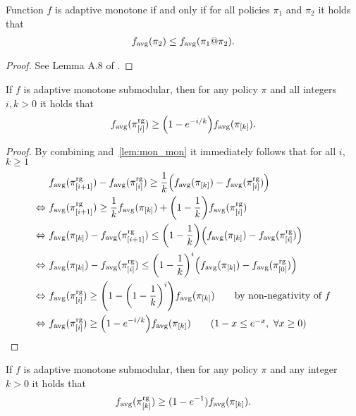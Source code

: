 \begin{lemma}\label{lem:mon_mon}
  Function $f$ is adaptive monotone if and only if for all policies $\pi_1$ and $\pi_2$ it holds that
  \begin{align*}
    f_{\mathrm{avg}}(\pi_2) \leq f_{\mathrm{avg}}(\pi_1 @ \pi_2).
  \end{align*}
\end{lemma}
\begin{proof}
See Lemma A.8 of \citet{golovin11}.
\end{proof}

\begin{theorem}
  If $f$ is adaptive monotone submodular, then for any policy $\pi$ and all integers $i, k > 0$ it holds that
  \begin{align*}
    \favg(\pigi) \geq \left(1 - e^{-i/k}\right)\favg(\pik).
  \end{align*}
\end{theorem}
\begin{proof}
  By combining  and~\ref{lem:mon_mon} it immediately follows that for all $i$, $k \geq 1$
  \begin{align*}
                   &\ \favg(\pigii) - \favg(\pigi) \geq \frac{1}{k}\left(\favg(\pik) - \favg(\pigi)\right)\\
    \Leftrightarrow&\ \favg(\pigii) \geq \frac{1}{k}\favg(\pik) + \left(1 - \frac{1}{k}\right) \favg(\pigi)\\
    \Leftrightarrow&\ \favg(\pik) - \favg(\pigii) \leq \left(1 - \frac{1}{k}\right)\left(\favg(\pik) - \favg(\pigi)\right)\\
    \Leftrightarrow&\ \favg(\pik) - \favg(\pigi) \leq \left(1 - \frac{1}{k}\right)^{i}\left(\favg(\pik) - \favg(\pigo)\right)\\
    \Leftrightarrow&\ \favg(\pigi) \geq \left(1 - \left(1 - \frac{1}{k}\right)^{i}\right)\favg(\pik)\tag*{by non-negativity of $f$}\\
    \Leftrightarrow&\ \favg(\pigi) \geq \left(1 - e^{-i/k}\right)\favg(\pik)\tag*{($1 - x \leq e^{-x},\ \forall x \geq 0$)}
  \end{align*}
\end{proof}

\begin{cor}
  If $f$ is adaptive monotone submodular, then for any policy $\pi$ and any integer $k > 0$ it holds that
  \begin{align*}
    f_{\mathrm{avg}}(\pi^{\textrm{rg}}_{[k]}) \geq (1 - e^{-1})f_{\mathrm{avg}}(\pi_{[k]}).
  \end{align*}
\end{cor}

